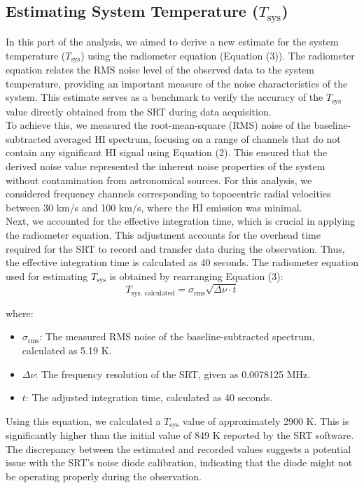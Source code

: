 \documentclass[linenumbers,twocolumn]{aastex631}
\begin{document}
\subsection{Estimating System Temperature ($T_{\text{sys}}$)}

In this part of the analysis, we aimed to derive a new estimate for the system temperature ($T_{\text{sys}}$) using the radiometer equation (Equation (3)). The radiometer equation relates the RMS noise level of the observed data to the system temperature, providing an important measure of the noise characteristics of the system. This estimate serves as a benchmark to verify the accuracy of the $T_{\text{sys}}$ value directly obtained from the SRT during data acquisition.  \\

To achieve this, we measured the root-mean-square (RMS) noise of the baseline-subtracted averaged HI spectrum, focusing on a range of channels that do not contain any significant HI signal using Equation (2). This ensured that the derived noise value represented the inherent noise properties of the system without contamination from astronomical sources. For this analysis, we considered frequency channels corresponding to topocentric radial velocities between 30 km/s and 100 km/s, where the HI emission was minimal. \\

Next, we accounted for the effective integration time, which is crucial in applying the radiometer equation. This adjustment accounts for the overhead time required for the SRT to record and transfer data during the observation. Thus, the effective integration time is calculated as 40 seconds.
The radiometer equation used for estimating $T_{\text{sys}}$ is obtained by rearranging Equation (3):
\[
T_{\text{sys, calculated}} = \sigma_{\text{rms}} \sqrt{\Delta \nu \cdot t}
\]

where:
\begin{itemize}
    \item $\sigma_{\text{rms}}$: The measured RMS noise of the baseline-subtracted spectrum, calculated as 5.19 K.
    \item $\Delta \nu$: The frequency resolution of the SRT, given as 0.0078125 MHz.
    \item $t$: The adjusted integration time, calculated as 40 seconds.
\end{itemize}

Using this equation, we calculated a $T_{\text{sys}}$ value of approximately 2900 K. This is significantly higher than the initial value of 849 K reported by the SRT software. The discrepancy between the estimated and recorded values suggests a potential issue with the SRT's noise diode calibration, indicating that the diode might not be operating properly during the observation.
\end{document}
